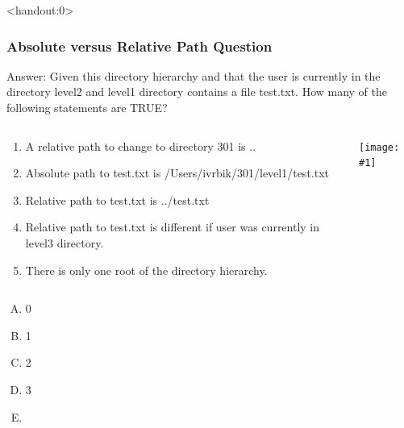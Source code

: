 \documentclass[xcolor=svgnames, colorlinks, handout]{beamer}
\newcommand{\tans}[2]{\textbf<#1>{\textit<#1>{{\color<#1>{iyellow}{#2}}}}}
\newcommand{\ipic}[2]{\texttt{[image: \#1]}}
\newcommand{\ft}[1]{\frametitle{#1}}
\begin{document}
\begin{frame}<handout:0>\ft{Absolute versus Relative Path Question}
  \begin{block}{Answer:}
Given this directory hierarchy and that the user is currently in the directory level2 and level1 directory contains a file test.txt. How many of the following statements are TRUE?
\begin{columns}[T] %
\begin{column}{.7\textwidth}
\begin{enumerate}
\item { A relative path to change to directory 301 is ..}
\item { Absolute path to test.txt is /Users/ivrbik/301/level1/test.txt}
\item { Relative path to test.txt is ../test.txt}
\item { Relative path to test.txt is different if user was currently in level3 directory.}
\item { There is only one root of the directory hierarchy.}
\end{enumerate}
\end{column}%
\hfill%
\begin{column}{.1\textwidth}
\hspace*{-1in}
\vspace*{-1in}
\ipic{relativepath}{4.5}
\end{column}%
\end{columns}
\begin{multicols}{7}
\begin{enumerate}[A)]
\item 0 
\item 1
\item 2
\item 3
\item \tans{6}{4}
\end{enumerate}
\end{multicols}
 \end{block} 
\end{frame}

\end{document}
